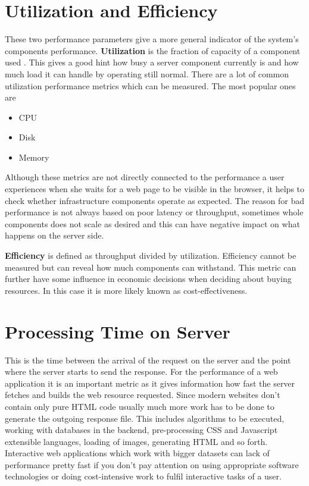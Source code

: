 \section{Utilization and Efficiency}
These two performance parameters give a more general indicator of the system's components performance. \textbf{Utilization} is the fraction of capacity of a component used \cite{Killelea_2002}. This gives a good hint how busy a server component currently is and how much load it can handle by operating still normal. There are a lot of common utilization performance metrics which can be measured. The most popular ones are
\begin{itemize}
	\item{CPU}
	\item{Disk}
	\item{Memory}
\end{itemize} 

Although these metrics are not directly connected to the performance a user experiences when she waits for a web page to be visible in the browser, it helps to check whether infrastructure components operate as expected. The reason for bad performance is not always based on poor latency or throughput, sometimes whole components does not scale as desired and this can have negative impact on what happens on the server side.

\textbf{Efficiency} is defined as throughput divided by utilization. Efficiency cannot be measured but can reveal how much components can withstand. This metric can further have some influence in economic decisions when deciding about buying resources. In this case it is more likely known as cost-effectiveness. \cite{Killelea_2002}
   
\section{Processing Time on Server}
This is the time between the arrival of the request on the server and the point where the server starts to send the response. For the performance of a web application it is an important metric as it gives information how fast the server fetches and builds the web resource requested. Since modern websites don't contain only pure HTML code usually much more work has to be done to generate the outgoing response file. This includes algorithms to be executed, working with databases in the backend, pre-processing CSS and Javascript extensible languages, loading of images, generating HTML and so forth. Interactive web applications which work with bigger datasets can lack of performance pretty fast if you don't pay attention on using appropriate software technologies or doing cost-intensive work to fulfil interactive tasks of a user. 

